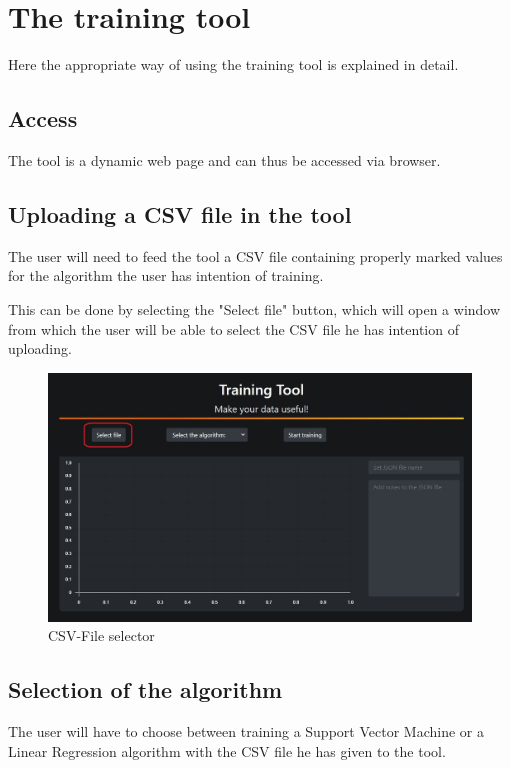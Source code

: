 \section{The training tool}
Here the appropriate way of using the training tool is explained in detail.

\subsection{Access}
The tool is a dynamic web page and can thus be accessed via browser.

\subsection{Uploading a CSV file in the tool}
The user will need to feed the tool a CSV file containing properly marked values for the algorithm the user has intention of training.

This can be done by selecting the "Select file" button, which will open a window from which the user will be able to select the CSV file he has intention of uploading.

\begin{figure}[H]
\centering
\includegraphics[scale=0.65]{img/tool/screen_1_tool.JPG}
\caption{CSV-File selector}
\end{figure}
\newpage

\subsection{Selection of the algorithm}
The user will have to choose between training a Support Vector Machine or a Linear Regression algorithm with the CSV file he has given to the tool.

